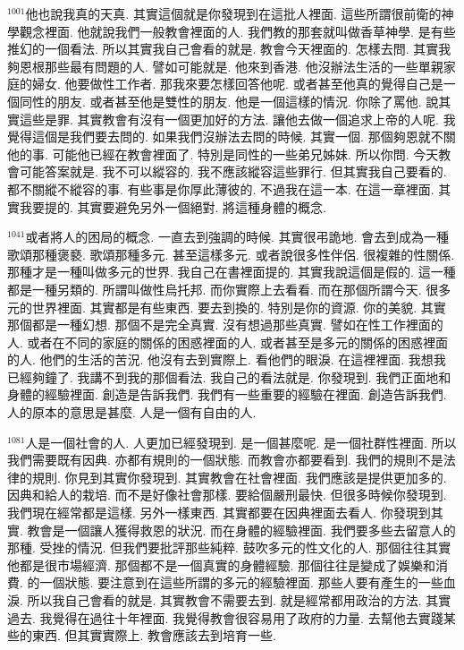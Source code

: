 \documentclass{book}
\begin{document}
$^{1001}$他也說我真的天真.
其實這個就是你發現到在這批人裡面.
這些所謂很前衛的神學觀念裡面.
他就說我們一般教會裡面的人.
我們教的那套就叫做香草神學.
是有些推幻的一個看法.
所以其實我自己會看的就是.
教會今天裡面的.
怎樣去問.
其實我夠恩根那些最有問題的人.
譬如可能就是.
他來到香港.
他沒辦法生活的一些單親家庭的婦女.
他要做性工作者.
那我來要怎樣回答他呢.
或者甚至他真的覺得自己是一個同性的朋友.
或者甚至他是雙性的朋友.
他是一個這樣的情況.
你除了罵他.
說其實這些是罪.
其實教會有沒有一個更加好的方法.
讓他去做一個追求上帝的人呢.
我覺得這個是我們要去問的.
如果我們沒辦法去問的時候.
其實一個.
那個夠恩就不關他的事.
可能他已經在教會裡面了.
特別是同性的一些弟兄姊妹.
所以你問.
今天教會可能答案就是.
我不可以縱容的.
我不應該縱容這些罪行.
但其實我自己要看的.
都不關縱不縱容的事.
有些事是你厚此薄彼的.
不過我在這一本.
在這一章裡面.
其實我要提的.
其實要避免另外一個絕對.
將這種身體的概念.

$^{1041}$或者將人的困局的概念.
一直去到強調的時候.
其實很弔詭地.
會去到成為一種歌頌那種褒褻.
歌頌那種多元.
甚至這樣多元.
或者說很多性伴侶.
很複雜的性關係.
那種才是一種叫做多元的世界.
我自己在書裡面提的.
其實我說這個是假的.
這一種都是一種另類的.
所謂叫做性烏托邦.
而你實際上去看看.
而在那個所謂今天.
很多元的世界裡面.
其實都是有些東西.
要去到換的.
特別是你的資源.
你的美貌.
其實那個都是一種幻想.
那個不是完全真實.
沒有想過那些真實.
譬如在性工作裡面的人.
或者在不同的家庭的關係的困惑裡面的人.
或者甚至是多元的關係的困惑裡面的人.
他們的生活的苦況.
他沒有去到實際上.
看他們的眼淚.
在這裡裡面.
我想我已經夠鐘了.
我講不到我的那個看法.
我自己的看法就是.
你發現到.
我們正面地和身體的經驗裡面.
創造是告訴我們.
我們有一些重要的經驗在裡面.
創造告訴我們.
人的原本的意思是甚麼.
人是一個有自由的人.

$^{1081}$人是一個社會的人.
人更加已經發現到.
是一個甚麼呢.
是一個社群性裡面.
所以我們需要既有因典.
亦都有規則的一個狀態.
而教會亦都要看到.
我們的規則不是法律的規則.
你見到其實你發現到.
其實教會在社會裡面.
我們應該是提供更加多的.
因典和給人的栽培.
而不是好像社會那樣.
要給個嚴刑最快.
但很多時候你發現到.
我們現在經常都是這樣.
另外一樣東西.
其實都要在因典裡面去看人.
你發現到其實.
教會是一個讓人獲得救恩的狀況.
而在身體的經驗裡面.
我們要多些去留意人的那種.
受挫的情況.
但我們要批評那些純粹.
鼓吹多元的性文化的人.
那個往往其實他都是很市場經濟.
那個都不是一個真實的身體經驗.
那個往往是變成了娛樂和消費.
的一個狀態.
要注意到在這些所謂的多元的經驗裡面.
那些人要有產生的一些血淚.
所以我自己會看的就是.
其實教會不需要去到.
就是經常都用政治的方法.
其實過去.
我覺得在過往十年裡面.
我覺得教會很容易用了政府的力量.
去幫他去實踐某些的東西.
但其實實際上.
教會應該去到培育一些.
\end{document}
